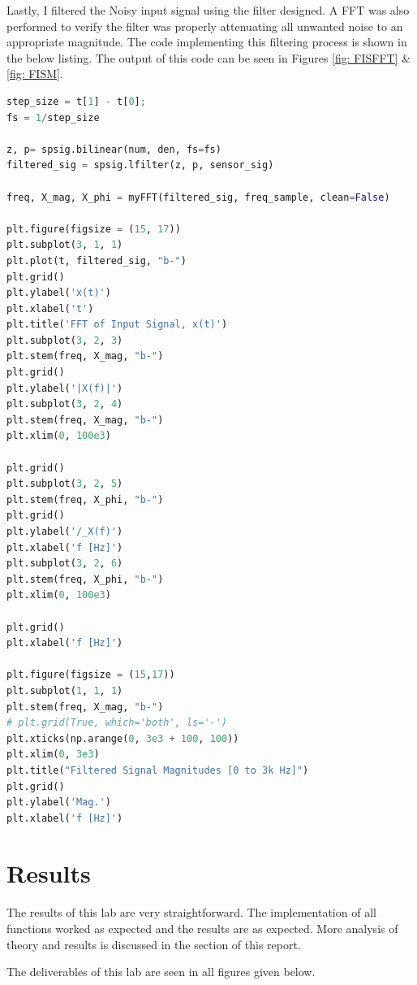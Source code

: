 \documentclass[12pt]{report}
\begin{document}
Lastly, I filtered the Noisy input signal using the filter designed. A FFT was also performed to verify the filter was
properly attenuating all unwanted noise to an appropriate magnitude. The code implementing this filtering process is
shown in the below listing. The output of this code can be seen in Figures \ref{fig: FISFFT} \& \ref{fig: FISM}.

\begin{lstlisting}[language=Python, basicstyle=\footnotesize]
step_size = t[1] - t[0];
fs = 1/step_size

z, p= spsig.bilinear(num, den, fs=fs)
filtered_sig = spsig.lfilter(z, p, sensor_sig)

freq, X_mag, X_phi = myFFT(filtered_sig, freq_sample, clean=False)

plt.figure(figsize = (15, 17))
plt.subplot(3, 1, 1)
plt.plot(t, filtered_sig, "b-")
plt.grid()
plt.ylabel('x(t)')
plt.xlabel('t')
plt.title('FFT of Input Signal, x(t)')
plt.subplot(3, 2, 3)
plt.stem(freq, X_mag, "b-")
plt.grid()
plt.ylabel('|X(f)|')
plt.subplot(3, 2, 4)
plt.stem(freq, X_mag, "b-")
plt.xlim(0, 100e3)

plt.grid()
plt.subplot(3, 2, 5)
plt.stem(freq, X_phi, "b-")
plt.grid()
plt.ylabel('/_X(f)')
plt.xlabel('f [Hz]')
plt.subplot(3, 2, 6)
plt.stem(freq, X_phi, "b-")
plt.xlim(0, 100e3)

plt.grid()
plt.xlabel('f [Hz]')

plt.figure(figsize = (15,17))
plt.subplot(1, 1, 1)
plt.stem(freq, X_mag, "b-")
# plt.grid(True, which='both', ls='-')
plt.xticks(np.arange(0, 3e3 + 100, 100))
plt.xlim(0, 3e3)
plt.title("Filtered Signal Magnitudes [0 to 3k Hz]")
plt.grid()
plt.ylabel('Mag.')
plt.xlabel('f [Hz]')
\end{lstlisting}

\section{Results}\label{section: Results}
The results of this lab are very straightforward. The implementation of all functions worked as expected and the results are as expected.
More analysis of theory and results is discussed in the  section of this report.

The deliverables of this lab are seen in all figures given below.
\end{document}
